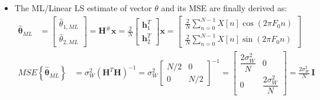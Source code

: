 \begin{itemize}
\begin{align*}
\end{align*}
\vspace{-1.5em}
\begin{align*}
\mathbf{h}_{2}^{T}\mathbf{h}_{2}
&= \lVert \mathbf{h}_{2} \rVert^{2}
 = \sum_{n=0}^{N-1} \sin^{2}(2\pi F_{0} n)
 = \sum_{n=0}^{N-1} \left(\frac{1}{2} - \frac{1}{2}\cos(4\pi F_{0} n)\right) \\[4pt]
&= \frac{N}{2}
   \left(1 - \frac{1}{N}\sum_{n=0}^{N-1}\cos(4\pi F_{0} n)\right)
 \approx \frac{N}{2}
\end{align*}
\vspace{-1.5em}
\begin{align*}
\mathbf{h}_{1}^{T}\mathbf{h}_{2}
&= \mathbf{h}_{2}^{T}\mathbf{h}_{1}
 = \sum_{n=0}^{N-1} \cos(2\pi F_{0} n)\sin(2\pi F_{0} n)
 = \frac{1}{2}\sum_{n=0}^{N-1}\cos(4\pi F_{0} n)
 \approx 0
\end{align*}

\item The ML/Linear LS estimate of vector \(\theta\) and its MSE are finally derived as:
\begin{align*}
\hat{\boldsymbol{\theta}}_{ML}
&=
\begin{bmatrix}
\hat{\theta}_{1,ML} \\
\hat{\theta}_{2,ML}
\end{bmatrix}
= \mathbf{H}^{\#}\mathbf{x}
= \frac{2}{N}
\begin{bmatrix}
\mathbf{h}_{1}^{T} \\
\mathbf{h}_{2}^{T}
\end{bmatrix}\mathbf{x}
=
\begin{bmatrix}
\displaystyle \frac{2}{N}\sum_{n=0}^{N-1} X[n]\cos(2\pi F_{0} n) \\[8pt]
\displaystyle \frac{2}{N}\sum_{n=0}^{N-1} X[n]\sin(2\pi F_{0} n)
\end{bmatrix}
\end{align*}
\vspace{-1.5em}
\begin{align*}
MSE\!\left\{\hat{\boldsymbol{\theta}}_{ML}\right\}
&= \sigma_W^{2}(\mathbf{H}^{T}\mathbf{H})^{-1}
 = \sigma_W^{2}
   \begin{bmatrix}
   N/2 & 0 \\
   0 & N/2
   \end{bmatrix}^{-1}
 = \begin{bmatrix}
   \dfrac{2\sigma_W^{2}}{N} & 0 \\
   0 & \dfrac{2\sigma_W^{2}}{N}
   \end{bmatrix}
 = \frac{2\sigma_W^{2}}{N}\,\mathbf{I}
\end{align*}


\end{itemize}

